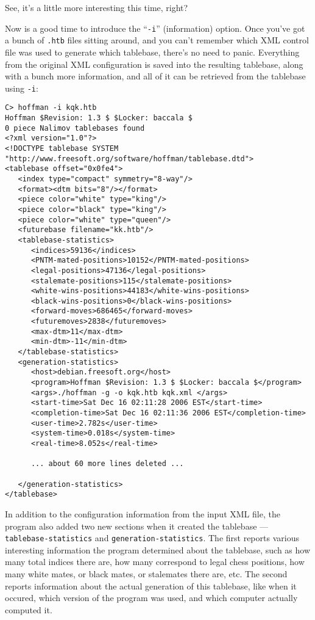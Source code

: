 \documentclass[11pt]{article}
\begin{document}
See, it's a little more interesting this time, right?

Now is a good time to introduce the ``{\tt -i}'' (information) option.
Once you've got a bunch of {\tt .htb} files sitting around, and you
can't remember which XML control file was used to generate which
tablebase, there's no need to panic.  Everything from the original XML
configuration is saved into the resulting tablebase, along with a
bunch more information, and all of it can be retrieved from the
tablebase using {\tt -i}:

{\small\begin{verbatim}
C> hoffman -i kqk.htb
Hoffman $Revision: 1.3 $ $Locker: baccala $
0 piece Nalimov tablebases found
<?xml version="1.0"?>
<!DOCTYPE tablebase SYSTEM "http://www.freesoft.org/software/hoffman/tablebase.dtd">
<tablebase offset="0x0fe4">
   <index type="compact" symmetry="8-way"/>
   <format><dtm bits="8"/></format>
   <piece color="white" type="king"/>
   <piece color="black" type="king"/>
   <piece color="white" type="queen"/>
   <futurebase filename="kk.htb"/>
   <tablebase-statistics>
      <indices>59136</indices>
      <PNTM-mated-positions>10152</PNTM-mated-positions>
      <legal-positions>47136</legal-positions>
      <stalemate-positions>115</stalemate-positions>
      <white-wins-positions>44183</white-wins-positions>
      <black-wins-positions>0</black-wins-positions>
      <forward-moves>686465</forward-moves>
      <futuremoves>2838</futuremoves>
      <max-dtm>11</max-dtm>
      <min-dtm>-11</min-dtm>
   </tablebase-statistics>
   <generation-statistics>
      <host>debian.freesoft.org</host>
      <program>Hoffman $Revision: 1.3 $ $Locker: baccala $</program>
      <args>./hoffman -g -o kqk.htb kqk.xml </args>
      <start-time>Sat Dec 16 02:11:28 2006 EST</start-time>
      <completion-time>Sat Dec 16 02:11:36 2006 EST</completion-time>
      <user-time>2.782s</user-time>
      <system-time>0.018s</system-time>
      <real-time>8.052s</real-time>

      ... about 60 more lines deleted ...

   </generation-statistics>
</tablebase>
\end{verbatim}}

In addition to the configuration information from the input XML file,
the program also added two new sections when it created the tablebase
--- {\tt tablebase-statistics} and {\tt generation-statistics}.  The
first reports various interesting information the program determined
about the tablebase, such as how many total indices there are, how
many correspond to legal chess positions, how many white mates, or
black mates, or stalemates there are, etc.  The second reports
information about the actual generation of this tablebase, like when
it occured, which version of the program was used, and which computer
actually computed it.
\end{document}
